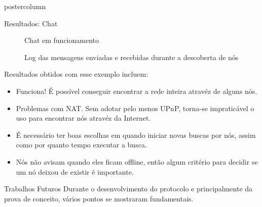 \documentclass[final]{beamer}
\begin{document}
\begin{frame}
\begin{columns}
\begin{column}{.5\textwidth}
\begin{beamercolorbox}[center,wd=\textwidth]{postercolumn}
\begin{minipage}[T]{.95\textwidth}
{\begin{block}{Resultados: Chat}
                \begin{figure}[htp]
                  \centering
                  \caption{Chat em funcionamento}
                \end{figure}
                \begin{figure}[htp]
                  \centering
                  \caption{Log das mensagens enviadas e recebidas durante a descoberta de nós}
                \end{figure}
                
                \vspace*{0.4cm}
                
                Resultados obtidos com esse exemplo incluem:
                \begin{itemize}
                  \item Funciona! É possível conseguir encontrar a rede inteira atravéz de alguns nós.
                  \item Problemas com NAT. Sem adotar pelo menos UPnP, torna-se impraticável o uso para encontrar nós atravéz da Internet.
                  \item É necessário ter boas escolhas em quando iniciar novas buscas por nós, assim como por quanto tempo executar a busca.
                  \item Nós não avisam quando eles ficam offline, então algum critério para decidir se um nó deixou de existir é importante.
                \end{itemize}
                
                \vspace*{0.2cm}
            \end{block}
            
            \vspace*{0.2cm} 
            \begin{block}{Trabalhos Futuros}
                Durante o desenvolvimento do protocolo e principalmente da prova de conceito, vários pontos se mostraram fundamentais.
                                

\end{block}}
\end{minipage}
\end{beamercolorbox}
\end{column}
\end{columns}
\end{frame}
\end{document}
